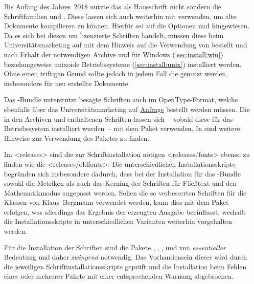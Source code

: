 Bis Anfang des Jahres~2018 nutzte das \TUDCD als Hausschrift nicht \OpenSans 
sondern die Schriftfamilien \Univers und \DIN. Diese lassen sich auch weiterhin 
mit \TUDScript verwenden, um alte Dokumente kompilieren zu können. Hierfür sei 
auf die Optionen  und  hingewiesen. 
Da es sich bei diesen um lizenzierte Schriften handelt, müssen diese beim 
Universitätsmarketing auf  mit dem 
Hinweis auf die Verwendung von  bestellt und nach Erhalt der 
notwendigen Archive  und  für 
Windows (\autoref{sec:install:win}) beziehungsweise unixoide Betriebssysteme 
(\autoref{sec:install:unix}) installiert werden. Ohne einen triftigen Grund 
sollte jedoch in jedem Fall die \OpenSans genutzt werden, insbesondere für neu 
erstellte Dokumente.

Das \TUDScript-Bundle unterstützt besagte Schriften auch im OpenType-Format, 
welche ebenfalls über das Universitätsmarketing auf 
\href{https://tu-dresden.de/cd}{Anfrage} bestellt werden müssen. Die in den 
Archiven  und  enthaltenen 
Schriften lassen sich~-- sobald diese für das Betriebssystem installiert 
wurden~-- mit dem Paket  verwenden. In  
sind weitere Hinweise zur Verwendung des Paketes  zu finden.

Im \GitHubRepo*<releases> sind die zur Schriftinstallation nötigen 
<releases/fonts> ebenso zu finden wie die
<releases/oldfonts>. Die 
unterschiedlichen Installationsskripte begründen sich insbesondere dadurch, 
dass bei der Installation für das \TUDScript-Bundle sowohl die Metriken als 
auch das Kerning der Schriften für Fließtext und den Mathematikmodus angepasst 
werden. Sollen die so verbesserten Schriften für die Klassen von Klaus~Bergmann 
verwendet werden, kann dies mit dem Paket  erfolgen, 
was allerdings das Ergebnis der erzeugten Ausgabe beeinflusst, weshalb die 
Installationsskripte in unterschiedlichen Varianten weiterhin vorgehalten 
werden.

Für die Installation der Schriften sind die Pakete , 
, ,  und 
 von \emph{essentieller} Bedeutung und daher \emph{zwingend} 
notwendig. Das Vorhandensein dieser wird durch die jeweiligen 
Schriftinstallationsskripte geprüft und die Installation beim Fehlen eines oder 
mehrerer Pakete mit einer entsprechenden Warnung abgebrochen.

